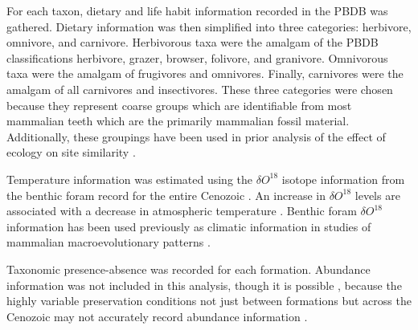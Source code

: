 \documentclass[12pt,letterpaper]{article}
\begin{document}
For each taxon, dietary and life habit information recorded in the PBDB was gathered. Dietary information was then simplified into three categories: herbivore, omnivore, and carnivore. Herbivorous taxa were the amalgam of the PBDB classifications herbivore, grazer, browser, folivore, and granivore. Omnivorous taxa were the amalgam of frugivores and omnivores. Finally, carnivores were the amalgam of all carnivores and insectivores. These three categories were chosen because they represent coarse groups which are identifiable from most mammalian teeth which are the primarily mammalian fossil material. Additionally, these groupings have been used in prior analysis of the effect of ecology on site similarity \citep{Jernvall2004}.

Temperature information was estimated using the \(\delta O^{18}\) isotope information from the benthic foram record for the entire Cenozoic \citep{Zachos2008}. An increase in \(\delta O^{18}\) levels are associated with a decrease in atmospheric temperature \citep{Zachos2001,Zachos2008}. Benthic foram \(\delta O^{18}\) information has been used previously as climatic information in studies of mammalian macroevolutionary patterns \citep{Alroy2000g,Figueirido2012,Rose2011}.
%
%

Taxonomic presence-absence was recorded for each formation. Abundance information was not included in this analysis, though it is possible \citep{Sidor2013}, because the highly variable preservation conditions not just between formations but across the Cenozoic may not accurately record abundance information \citep{Damuth1982}.

%
%
\end{document}
